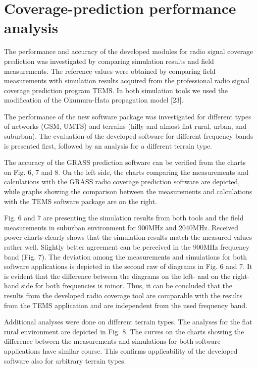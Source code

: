\section{Coverage-prediction performance analysis}

The performance and accuracy of the developed modules for radio signal
coverage prediction was investigated by comparing simulation results
and field measurements. The reference values were obtained by comparing
field measurements with simulation results acquired from the professional
radio signal coverage prediction program TEMS. In both simulation
tools we used the modification of the Okumura-Hata propagation model
{[}23{]}.

The performance of the new software package was investigated for different
types of networks (GSM, UMTS) and terrains (hilly and almost flat
rural, urban, and suburban). The evaluation of the developed software
for different frequency bands is presented first, followed by an analysis
for a different terrain type.

The accuracy of the GRASS prediction software can be verified from
the charts on Fig. 6, 7 and 8. On the left side, the charts comparing
the measurements and calculations with the GRASS radio coverage prediction
software are depicted, while graphs showing the comparison between
the measurements and calculations with the TEMS software package are
on the right.

Fig. 6 and 7 are presenting the simulation results from both tools
and the field measurements in suburban environment for 900MHz and
2040MHz. Received power charts clearly shows that the simulation results
match the measured values rather well. Slightly better agreement can
be perceived in the 900MHz frequency band (Fig. 7). The deviation
among the measurements and simulations for both software applications
is depicted in the second raw of diagrams in Fig. 6 and 7. It is evident
that the difference between the diagrams on the left- and on the right-hand
side for both frequencies is minor. Thus, it can be concluded that
the results from the developed radio coverage tool are comparable
with the results from the TEMS application and are independent from
the used frequency band.

Additional analyses were done on different terrain types. The analyses
for the flat rural environment are depicted in Fig. 8. The curves
on the charts showing the difference between the measurements and
simulations for both software applications have similar course. This
confirms applicability of the developed software also for arbitrary
terrain types.

